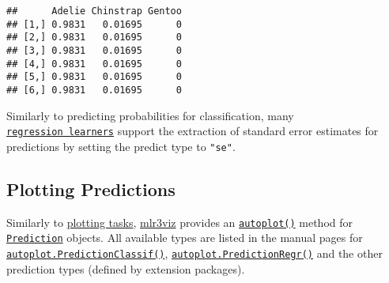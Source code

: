 \documentclass[
]{scrbook}
\newenvironment{Shaded}{\begin{snugshade}}{\end{snugshade}}
\newcommand{\AttributeTok}[1]{\textcolor[rgb]{0.77,0.63,0.00}{#1}}
\newcommand{\CommentTok}[1]{\textcolor[rgb]{0.56,0.35,0.01}{\textit{#1}}}
\newcommand{\FunctionTok}[1]{\textcolor[rgb]{0.00,0.00,0.00}{#1}}
\newcommand{\NormalTok}[1]{#1}
\newcommand{\OtherTok}[1]{\textcolor[rgb]{0.56,0.35,0.01}{#1}}
\newcommand{\SpecialCharTok}[1]{\textcolor[rgb]{0.00,0.00,0.00}{#1}}
\newcommand{\StringTok}[1]{\textcolor[rgb]{0.31,0.60,0.02}{#1}}
\renewenvironment{Shaded} {\begin{snugshade}\small} {\end{snugshade}}
\begin{document}
\begin{Shaded}
\end{Shaded}

\begin{verbatim}
##      Adelie Chinstrap Gentoo
## [1,] 0.9831   0.01695      0
## [2,] 0.9831   0.01695      0
## [3,] 0.9831   0.01695      0
## [4,] 0.9831   0.01695      0
## [5,] 0.9831   0.01695      0
## [6,] 0.9831   0.01695      0
\end{verbatim}

Similarly to predicting probabilities for classification, many \href{https://mlr3.mlr-org.com/reference/LearnerRegr.html}{\texttt{regression\ learners}} support the extraction of standard error estimates for predictions by setting the predict type to \texttt{"se"}.

\hypertarget{autoplot-prediction}{%
\subsection{Plotting Predictions}\label{autoplot-prediction}}

Similarly to \protect\hyperlink{autoplot-task}{plotting tasks}, \href{https://mlr3viz.mlr-org.com}{mlr3viz} provides an \href{https://www.rdocumentation.org/packages/ggplot2/topics/autoplot}{\texttt{autoplot()}} method for \href{https://mlr3.mlr-org.com/reference/Prediction.html}{\texttt{Prediction}} objects.
All available types are listed in the manual pages for \href{https://mlr3viz.mlr-org.com/reference/autoplot.PredictionClassif.html}{\texttt{autoplot.PredictionClassif()}}, \href{https://mlr3viz.mlr-org.com/reference/autoplot.PredictionRegr.html}{\texttt{autoplot.PredictionRegr()}} and the other prediction types (defined by extension packages).

\begin{Shaded}
\end{Shaded}
\end{document}
